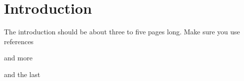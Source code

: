 \chapter{Introduction}
The introduction should be about three to five pages long.
Make sure you use references~\cite{einstein}

and more \cite{latexcompanion}

and the last \cite{knuthwebsite}